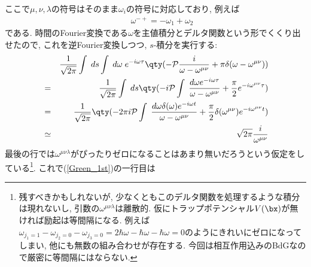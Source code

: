 \documentclass[10.5pt,a4paper]{jreport}
\begin{document}
ここで$\mu, \nu, \lambda$の符号はそのまま$\omega_i$の符号に対応しており, 例えば
\begin{eqnarray}
  &&\omega^{-+} = -\omega_1 + \omega_2
\end{eqnarray}
である. 時間のFourier変換である$\omega$を主値積分とデルタ関数という形でくくり出せたので, これを逆Fourier変換しつつ, $s$-積分を実行する:
\begin{eqnarray}
  &&\frac{1}{\sqrt{2\pi}} \int\;ds\int\;d\omega\; e^{-i\omega\tau}\qty(-{\cal P}\frac{i}{\omega - \omega^{\mu\nu}} + \pi\delta(\omega - \omega^{\mu\nu}))\\
  &=&\frac{1}{\sqrt{2\pi}}\int\;ds\qty(-i{\cal P}\int\;\frac{d\omega e^{-i\omega\tau}}{\omega - \omega^{\mu\nu}} + \frac{\pi}{2}e^{-i\omega^{\mu\nu}\tau})\\
  &=& \frac{1}{\sqrt{2\pi}}\qty(-2\pi i{\cal P}\int\;\frac{d\omega \delta(\omega)e^{-i\omega t}}{\omega - \omega^{\mu\nu}} + \frac{\pi}{2}\delta(\omega^{\mu\nu})e^{-i\omega^{\mu\nu}t})\\
  &\simeq&\sqrt{2\pi}\frac{i}{\omega^{\mu\nu}}
\end{eqnarray}
最後の行では$\omega^{\mu\nu\lambda}$がぴったりゼロになることはあまり無いだろうという仮定をしている\footnote{残すべきかもしれないが, 少なくともこのデルタ関数を処理するような積分は現れないし, 引数の$\omega^{\mu\nu\lambda}$は離散的. 仮にトラップポテンシャル$V(\bx)$が無ければ励起は等間隔になる. 例えば$\omega_{j_1 = 1} - \omega_{j_2 = 0} - \omega_{j_3 = 0} = 2\hbar\omega -\hbar\omega - \hbar\omega = 0$のようにきれいにゼロになってしまい, 他にも無数の組み合わせが存在する. 今回は相互作用込みのBdGなので厳密に等間隔にはならない.}. これで(\ref{Green_1st})の一行目は
\end{document}
